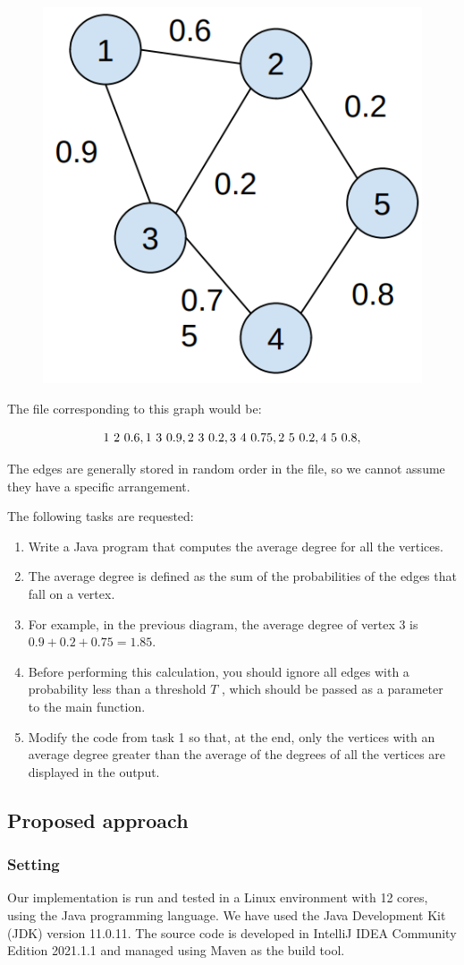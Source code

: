 \documentclass[acmlarge]{acmart}
\begin{document}
\begin{figure}[h]
  \centering
  \includegraphics[width=0.25\linewidth]{figures/graph}
\end{figure}

The file corresponding to this graph would be:

\[
  1 \ 2 \ 0.6, \\
  1 \ 3 \ 0.9, \\
  2 \ 3 \ 0.2, \\
  3 \ 4 \ 0.75, \\
  2 \ 5 \ 0.2, \\
  4 \ 5 \ 0.8,
\]

The edges are generally stored in random order in the file, so we cannot assume they have a specific arrangement.

The following tasks are requested:

\begin{enumerate}
  \item Write a Java program that computes the average degree for all the vertices.
  \item The average degree is defined as the sum of the probabilities of the edges that fall on a vertex.
  \item For example, in the previous diagram, the average degree of vertex 3 is \( 0.9 + 0.2 + 0.75 = 1.85 \).
  \item Before performing this calculation, you should ignore all edges with a probability less than a threshold \( T \)
        , which should be passed as a parameter to the main function.
  \item Modify the code from task 1 so that, at the end, only the vertices with an average degree greater than the
        average of the degrees of all the vertices are displayed in the output.

\end{enumerate}

\subsection{Proposed approach}
\subsubsection{Setting}
Our implementation is run and tested in a Linux environment with 12 cores, using the Java programming language.
We have used the Java Development Kit (JDK) version 11.0.11.
The source code is developed in IntelliJ IDEA Community Edition 2021.1.1 and managed using Maven as the build tool.
\end{document}

